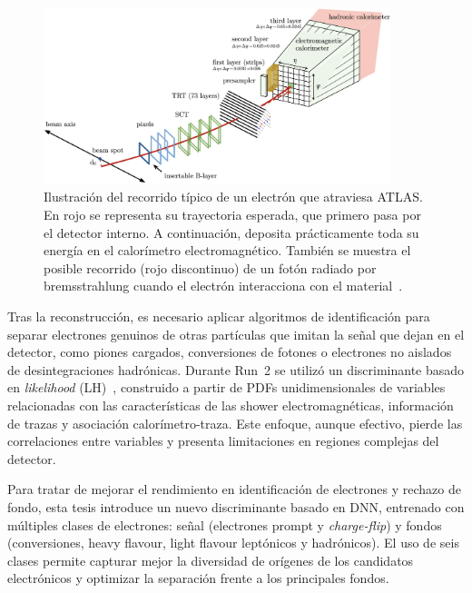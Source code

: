 \begin{figure}[htbp]
  \centering
  \includegraphics[width=0.9\textwidth]{images/electron_journey.png}
  \caption{Ilustración del recorrido típico de un electrón que atraviesa ATLAS. En rojo se representa su trayectoria esperada, que primero pasa por el detector interno. A continuación, deposita prácticamente toda su energía en el calorímetro electromagnético. También se muestra el posible recorrido (rojo discontinuo) de un fotón radiado por bremsstrahlung cuando el electrón interacciona con el material~\cite{Aaboud:2657964}.}
  \label{res:electron_journey}
\end{figure}

Tras la reconstrucción, es necesario aplicar algoritmos de identificación para separar electrones genuinos de otras partículas que imitan la señal que dejan en el detector, como piones cargados, conversiones de fotones o electrones no aislados de desintegraciones hadrónicas. Durante Run~2 se utilizó un discriminante basado en \textit{likelihood} (LH)~\cite{Aad:2684552,Aaboud:2657964}, construido a partir de PDFs unidimensionales de variables relacionadas con las características de las shower electromagnéticas, información de trazas y asociación calorímetro-traza. Este enfoque, aunque efectivo, pierde las correlaciones entre variables y presenta limitaciones en regiones complejas del detector.  

Para tratar de mejorar el rendimiento en identificación de electrones y rechazo de fondo, esta tesis introduce un nuevo discriminante basado en DNN, entrenado con múltiples clases de electrones: señal (electrones prompt y \textit{charge-flip}) y fondos (conversiones, heavy flavour, light flavour leptónicos y hadrónicos). El uso de seis clases permite capturar mejor la diversidad de orígenes de los candidatos electrónicos y optimizar la separación frente a los principales fondos.  

